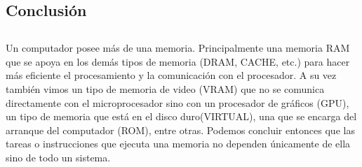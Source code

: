 \documentclass{article}
\begin{document}
    


\begin{center}
    

\section{Conclusión} \label{conclulsion} \end{center}
\subsection{}
Un computador posee más de una memoria. Principalmente una memoria RAM que se apoya en los demás tipos de memoria (DRAM, CACHE, etc.) para hacer más eficiente el procesamiento y la comunicación con el procesador. A su vez también vimos un tipo de memoria de video (VRAM) que no se comunica directamente con el microprocesador sino con un procesador de gráficos (GPU), un tipo de memoria que está en el disco duro(VIRTUAL), una que se encarga del arranque del computador (ROM), entre otras.
\newline
Podemos concluir entonces que las tareas o instrucciones que ejecuta una memoria no dependen únicamente de ella sino de todo un sistema.


\pagebreak



\label{graficas}
\end{document}
